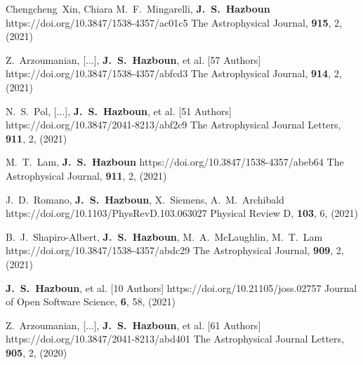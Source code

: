         {Chengcheng~{Xin}, Chiara M.~F.~{Mingarelli}, \textbf{J.~S.~Hazboun}}
         {https://doi.org/10.3847/1538-4357/ac01c5}
         {{The Astrophysical Journal}, \textbf{915}, 2, (2021)}

         {Z.~{Arzoumanian}, [...], \textbf{J.~S.~{Hazboun}}, et al. [57 Authors]}
         {https://doi.org/10.3847/1538-4357/abfcd3}
         {{The Astrophysical Journal}, \textbf{914}, 2, (2021)}

         {N.~S.~{Pol}, [...], \textbf{J.~S.~{Hazboun}}, et al. [51 Authors]}
         {https://doi.org/10.3847/2041-8213/abf2c9}
         {{The Astrophysical Journal Letters}, \textbf{911}, 2, (2021)}

         {M.~T.~{Lam}, \textbf{J.~S.~Hazboun}}
         {https://doi.org/10.3847/1538-4357/abeb64}
         {{The Astrophysical Journal}, \textbf{911}, 2, (2021)}

         {J.~D.~{Romano}, \textbf{J.~S.~Hazboun}, X.~{Siemens}, A.~M.~{Archibald}}
         {https://doi.org/10.1103/PhysRevD.103.063027}
         {{Physical Review D}, \textbf{103}, 6, (2021)}

         {B.~J.~Shapiro-Albert, \textbf{J.~S.~Hazboun}, M.~A.~{McLaughlin}, M.~T.~{Lam}}
         {https://doi.org/10.3847/1538-4357/abdc29}
         {{The Astrophysical Journal}, \textbf{909}, 2, (2021)}

         {\textbf{J.~S.~{Hazboun}}, et al. [10 Authors]}
         {https://doi.org/10.21105/joss.02757}
         {{Journal of Open Software Science}, \textbf{6}, 58, (2021)}

         {Z.~{Arzoumanian}, [...], \textbf{J.~S.~{Hazboun}}, et al. [61 Authors]}
         {https://doi.org/10.3847/2041-8213/abd401}
         {{The Astrophysical Journal Letters}, \textbf{905}, 2, (2020)}

